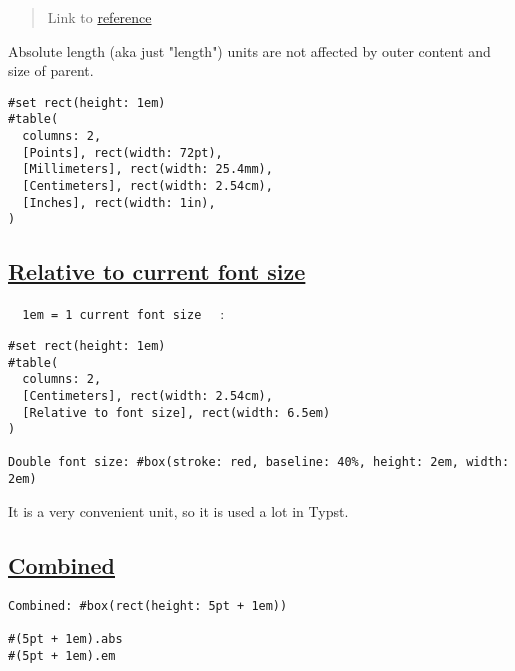 \begin{quote}
Link to
\href{https://typst.app/docs/reference/layout/length/}{reference}
\end{quote}

Absolute length (aka just "length") units are not affected by outer
content and size of parent.

\begin{verbatim}
#set rect(height: 1em)
#table(
  columns: 2,
  [Points], rect(width: 72pt),
  [Millimeters], rect(width: 25.4mm),
  [Centimeters], rect(width: 2.54cm),
  [Inches], rect(width: 1in),
)
\end{verbatim}

\pandocbounded{}

\subsection{\texorpdfstring{\hyperref[relative-to-current-font-size]{Relative
to current font
size}}{Relative to current font size}}\label{relative-to-current-font-size}

\texttt{\ }{\texttt{\ 1em\ =\ 1\ current\ font\ size\ }}\texttt{\ } :

\begin{verbatim}
#set rect(height: 1em)
#table(
  columns: 2,
  [Centimeters], rect(width: 2.54cm),
  [Relative to font size], rect(width: 6.5em)
)

Double font size: #box(stroke: red, baseline: 40%, height: 2em, width: 2em)
\end{verbatim}

\pandocbounded{}

It is a very convenient unit, so it is used a lot in Typst.

\subsection{\texorpdfstring{\hyperref[combined]{Combined}}{Combined}}\label{combined}

\begin{verbatim}
Combined: #box(rect(height: 5pt + 1em))

#(5pt + 1em).abs
#(5pt + 1em).em
\end{verbatim}

\pandocbounded{}

